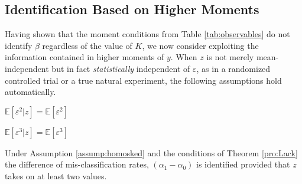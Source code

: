 \subsection{Identification Based on Higher Moments}
Having shown that the moment conditions from Table \ref{tab:observables} do not identify $\beta$ regardless of the value of $K$, we now consider exploiting the information contained in higher moments of $y$. 
When $z$ is not merely mean-independent but in fact \emph{statistically} independent of $\varepsilon$, as in a randomized controlled trial or a true natural experiment, the following assumptions hold automatically.
\begin{assump}
  $\mathbb{E}[\varepsilon^2|z]=\mathbb{E}[\varepsilon^2]$
  \label{assump:homosked}
\end{assump}
\begin{assump}
  $\mathbb{E}[\varepsilon^3|z]=\mathbb{E}[\varepsilon^3]$
  \label{assump:skew}
\end{assump}
\begin{thm}
  \label{pro:homosked}
  Under Assumption \ref{assump:homosked} and the conditions of Theorem \ref{pro:Lack} the difference of mis-classification rates, $(\alpha_1 - \alpha_0)$ is identified provided that $z$ takes on at least two values.
\end{thm}
